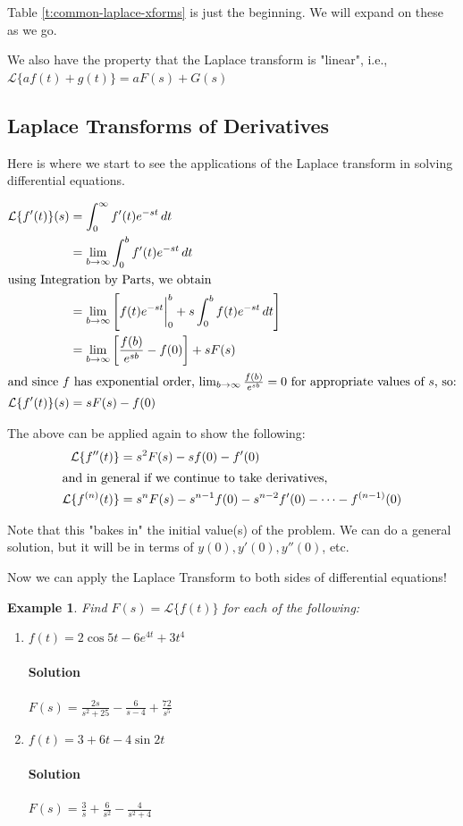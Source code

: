 \documentclass[letterpaper, 11pt, openany]{book}
\theoremstyle{mytheoremstyle}
\theoremstyle{myexamplestyle}
\newtheorem{example}{Example}[section]
\newenvironment{solution}{\paragraph{\sffamily \smaller \fontseries{b}\selectfont Solution}}{\hfill\faSquare}
\begin{document}
Table \ref{t:common-laplace-xforms} is just the beginning. We will expand on these as we go.

We also have the property that the Laplace transform is "linear", i.e., \(\mathcal{L}\{a f(t) + g(t)\} = a F(s) + G(s)\)

\subsection{Laplace Transforms of Derivatives}

Here is where we start to see the applications of the Laplace transform in solving differential equations.

\begin{align*}
    \mathcal{L}\{f'(t)\}(s) &= \int_{0}^{\infty} f'(t) e^{-st} \, dt \\
                            &= \lim_{b \to \infty} \int_{0}^{b}f'(t) e^{-st} \, dt\\
    \intertext{using Integration by Parts, we obtain}
                            &= \lim_{b \to \infty} \left[f(t) e^{-st} \bigg|_{0}^{b} + s\int_{0}^{b}f(t) e^{-st} \, dt \right]\\
                            &= \lim_{b \to \infty} \left[\frac{f(b)}{e^{sb}} - f(0)\right] + s F(s)\\
    \intertext{and since \(f\) has exponential order, \(\lim_{b \to \infty} \frac{f(b)}{e^{sb}} = 0\) for appropriate values of \(s\), so:}
    \mathcal{L}\{f'(t)\}(s) &= s F(s) - f(0)
\end{align*}

The above can be applied again to show the following:
\begin{align*}
    \mathcal{L}\{f''(t)\} &= s^2 F(s) - sf(0) - f'(0)\\
    \intertext{and in general if we continue to take derivatives,}
    \mathcal{L}\{f^{(n)}(t)\} &= s^n F(s) - s^{n-1} f(0) - s^{n-2}f'(0) - \cdots - f^{(n-1)}(0)
\end{align*}

Note that this "bakes in" the initial value(s) of the problem. We can do a general solution, but it will be in terms of \(y(0), y'(0), y''(0)\), etc.

Now we can apply the Laplace Transform to both sides of differential equations!

\begin{example}\label{e:laplace-xform-basic}
    Find \(F(s) = \mathcal{L}\{f(t)\}\) for each of the following:
    \begin{enumerate}
        \item \(f(t) = 2 \cos 5t - 6e^{4t} + 3t^4\)
        \begin{solution}
            \(\displaystyle F(s) = \frac{2s}{s^2 + 25} - \frac{6}{s-4} + \frac{72}{s^5}\)
        \end{solution}
        \item \(f(t) = 3 + 6t - 4\sin 2t\)
        \begin{solution}
            \(\displaystyle F(s) = \frac{3}{s} + \frac{6}{s^2} - \frac{4}{s^2 + 4}\)
        \end{solution}
    \end{enumerate}
\end{example}
\end{document}
